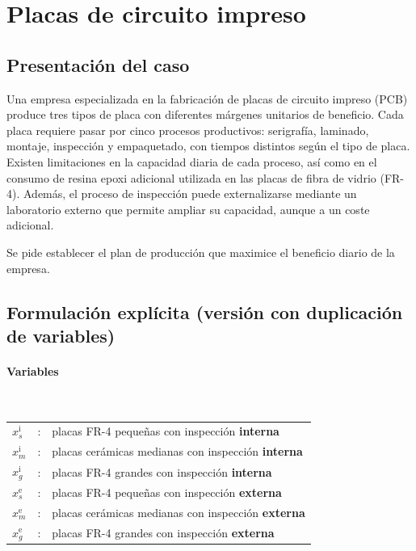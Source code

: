 \section{Placas de circuito impreso}

\subsection{Presentación del caso}
Una empresa especializada en la fabricación de placas de circuito impreso (PCB) produce tres tipos de placa con diferentes márgenes unitarios de beneficio.
Cada placa requiere pasar por cinco procesos productivos: serigrafía, laminado, montaje, inspección y empaquetado, con tiempos distintos según el tipo de placa.
Existen limitaciones en la capacidad diaria de cada proceso, así como en el consumo de resina epoxi adicional utilizada en las placas de fibra de vidrio (FR-4).
Además, el proceso de inspección puede externalizarse mediante un laboratorio externo que permite ampliar su capacidad, aunque a un coste adicional.

Se pide establecer el plan de producción que maximice el beneficio diario de la empresa.

\subsection{Formulación explícita (versión con duplicación de variables)}

\paragraph{Variables}\mbox{}\\
\begin{tabular}{l c l}
  $x_s^{\mathrm{i}}$ & : & placas FR-4 pequeñas con inspección \textbf{interna}\\
  $x_m^{\mathrm{i}}$ & : & placas cerámicas medianas con inspección \textbf{interna}\\
  $x_g^{\mathrm{i}}$ & : & placas FR-4 grandes con inspección \textbf{interna}\\
  $x_s^{\mathrm{e}}$ & : & placas FR-4 pequeñas con inspección \textbf{externa}\\
  $x_m^{\mathrm{e}}$ & : & placas cerámicas medianas con inspección \textbf{externa}\\
  $x_g^{\mathrm{e}}$ & : & placas FR-4 grandes con inspección \textbf{externa}\\
\end{tabular}


